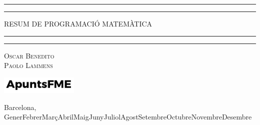 \newcommand{\plogo}{\fbox{$\mathcal{PL}$}} %
{

    \centering %

    \scshape %

    \rule{\textwidth}{1.6pt}\vspace*{-\baselineskip}\vspace*{2pt} %
    \rule{\textwidth}{0.4pt} %

    \vspace{0.40\baselineskip} %

    {\LARGE RESUM DE PROGRAMACIÓ MATEMÀTICA} %

    \vspace{0.01\baselineskip} %

    \rule{\textwidth}{0.4pt}\vspace*{-\baselineskip}\vspace{3.2pt} %
    \rule{\textwidth}{1.6pt} %

    \vspace{0.5\baselineskip} %

    {\scshape\large Oscar Benedito\\Paolo Lammens} %
    \author{Oscar Benedito \and Paolo Lammens}

    \vspace{1\baselineskip} %

    \includegraphics[width=3.7cm]{../logo.pdf}

    \vspace{-0.3\baselineskip} %
    
        
    Barcelona, {\ifcase \month \or Gener\or Febrer\or Març\or Abril\or Maig\or Juny\or Juliol\or Agost\or Setembre\or Octubre\or Novembre\or Desembre\fi \:  \number \year} %


    
    \thispagestyle{empty}
}
